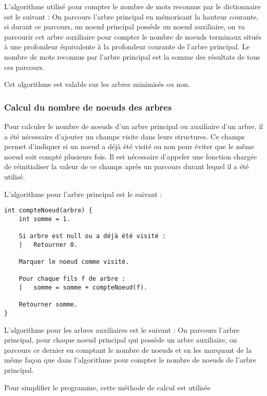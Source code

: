 \documentclass[15pt, a4paper]{article}
\begin{document}
L'algorithme utilisé pour compter le nombre de mots reconnus par le dictionnaire
est le suivant : On parcours l'arbre principal en mémorisant la hauteur 
courante, si durant ce parcours, un noeud principal possède un noeud auxiliaire,
on va parcourir cet arbre auxiliaire pour compter le nombre de noeuds 
terminaux situés à une profondeur équivalente à la profondeur courante de l'arbre
principal. Le nombre de mots reconnus par l'arbre principal est la somme des 
résultats de tous ces parcours.

\bigskip

\noindent Cet algorithme est valable sur les arbres minimisés ou non.

\subsubsection{Calcul du nombre de noeuds des arbres}

Pour calculer le nombre de noeuds d'un arbre principal ou auxiliaire d'un arbre, 
il a été nécessaire 
d'ajouter un champs visite dans leurs structures. Ce champs 
permet d'indiquer si un noeud a déjà été visité ou non pour éviter que le même
noeud soit compté plusieurs fois. Il est nécessaire d'appeler une fonction chargée
de réinitialiser la valeur de ce champs après un parcours durant lequel il a été
utilisé.

\bigskip

\noindent L'algorithme pour l'arbre principal est le suivant : 

\bigskip

\begin{verbatim}
int compteNoeud(arbre) {
    int somme = 1.

    Si arbre est null ou a déjà été visité :
    |   Retourner 0.

    Marquer le noeud comme visité.

    Pour chaque fils f de arbre :
    |   somme = somme + compteNoeud(f).

    Retourner somme.
}
\end{verbatim}

\bigskip

L'algorithme pour les arbres auxiliaires est le suivant : On parcours l'arbre principal, 
pour chaque noeud principal qui possède un arbre auxiliaire, on parcours ce dernier en
comptant le nombre de noeuds et en les marquant de la même façon que dans l'algorithme pour 
compter le nombre de noeuds de l'arbre principal.

Pour simplifier le programme, cette méthode de calcul est utilisée
\end{document}
